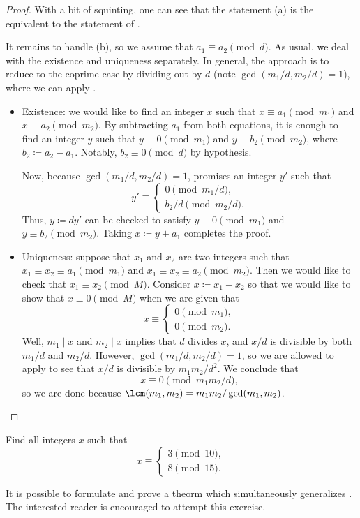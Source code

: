 \documentclass{article}
\begin{document}
\begin{proof}
	With a bit of squinting, one can see that the statement (a) is the equivalent to the statement of .
	
	It remains to handle (b), so we assume that $a_1\equiv a_2\pmod d$. As usual, we deal with the existence and uniqueness separately. In general, the approach is to reduce to the coprime case by dividing out by $d$ (note $\gcd(m_1/d,m_2/d)=1$), where we can apply .
	\begin{itemize}
		\item Existence: we would like to find an integer $x$ such that $x\equiv a_1\pmod{m_1}$ and $x\equiv a_2\pmod{m_2}$. By subtracting $a_1$ from both equations, it is enough to find an integer $y$ such that $y\equiv0\pmod{m_1}$ and $y\equiv b_2\pmod{m_2}$, where $b_2\coloneqq a_2-a_1$. Notably, $b_2\equiv0\pmod d$ by hypothesis.

		Now, because $\gcd(m_1/d,m_2/d)=1$,  promises an integer $y'$ such that
		\[y'\equiv\begin{cases}
			0 \pmod{m_1/d}, \\
			b_2/d \pmod{m_2/d}.
		\end{cases}\]
		Thus, $y\coloneqq dy'$ can be checked to satisfy $y\equiv0\pmod{m_1}$ and $y\equiv b_2\pmod{m_2}$. Taking $x\coloneqq y+a_1$ completes the proof.

		\item Uniqueness: suppose that $x_1$ and $x_2$ are two integers such that $x_1\equiv x_2\equiv a_1\pmod{m_1}$ and $x_1\equiv x_2\equiv a_2\pmod{m_2}$. Then we would like to check that $x_1\equiv x_2\pmod M$. Consider $x\coloneqq x_1-x_2$ so that we would like to show that $x\equiv0\pmod M$ when we are given that
		\[x\equiv\begin{cases}
			0\pmod{m_1}, \\
			0\pmod{m_2}.
		\end{cases}\]
		Well, $m_1\mid x$ and $m_2\mid x$ implies that $d$ divides $x$, and $x/d$ is divisible by both $m_1/d$ and $m_2/d$. However, $\gcd(m_1/d,m_2/d)=1$, so we are allowed to apply  to see that $x/d$ is divisible by $m_1m_2/d^2$. We conclude that
		\[x\equiv0\pmod{m_1m_2/d},\]
		so we are done because $\lcm(m_1,m_2)=m_1m_2/\gcd(m_1,m_2)$.
		\qedhere
	\end{itemize}
\end{proof}
\begin{exe}
	Find all integers $x$ such that
	\[x\equiv\begin{cases}
		3\pmod{10}, \\
		8\pmod{15}.
	\end{cases}\]
\end{exe}
\begin{remark}
	It is possible to formulate and prove a theorm which simultaneously generalizes . The interested reader is encouraged to attempt this exercise.
\end{remark}
\end{document}
